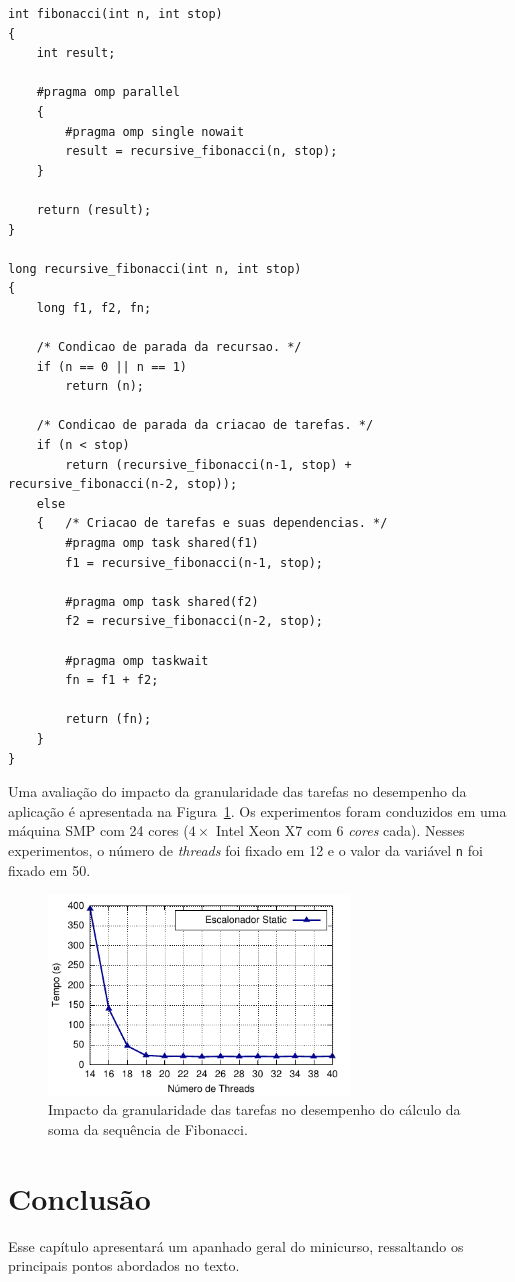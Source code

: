 \documentclass{SBCbookchapter}
\begin{document}
\begin{lstlisting}[frame=single, caption=Exemplo de uma implementação recursiva simples da soma da sequencia de Fibonacci
usando tarefas., label=listing:fibonacci]
int fibonacci(int n, int stop)
{
	int result;
	
	#pragma omp parallel
  	{
		#pragma omp single nowait
		result = recursive_fibonacci(n, stop);
	}
		
	return (result);
}

long recursive_fibonacci(int n, int stop)
{
	long f1, f2, fn;

	/* Condicao de parada da recursao. */
	if (n == 0 || n == 1) 
		return (n);

	/* Condicao de parada da criacao de tarefas. */
	if (n < stop) 
		return (recursive_fibonacci(n-1, stop) + recursive_fibonacci(n-2, stop));
	else
	{	/* Criacao de tarefas e suas dependencias. */
		#pragma omp task shared(f1)
		f1 = recursive_fibonacci(n-1, stop);

		#pragma omp task shared(f2)
		f2 = recursive_fibonacci(n-2, stop);
		
		#pragma omp taskwait
		fn = f1 + f2;
			
		return (fn);
	}
}
\end{lstlisting}

	Uma avaliação do impacto da granularidade das tarefas no desempenho da aplicação é apresentada na
	Figura~\ref{fig:grao-tarefas}. Os experimentos foram conduzidos em uma máquina SMP com 24 cores
	($4 \times$ Intel Xeon X7 com 6 \textit{cores} cada). Nesses experimentos, o número de \textit{threads} foi fixado
	em 12 e o valor da variável \texttt{n} foi fixado em 50.

	\begin{figure}[t]
		\centering
		\includegraphics[width=8cm, height=!]{img/fibonacci-task-grain}
		\caption{Impacto da granularidade das tarefas no desempenho do cálculo da soma da sequência
		de Fibonacci.}
		\label{fig:grao-tarefas}
	\end{figure}

\section{Conclusão}

	Esse capítulo apresentará um apanhado geral do minicurso, ressaltando os
	principais pontos abordados no texto.


\end{document}
